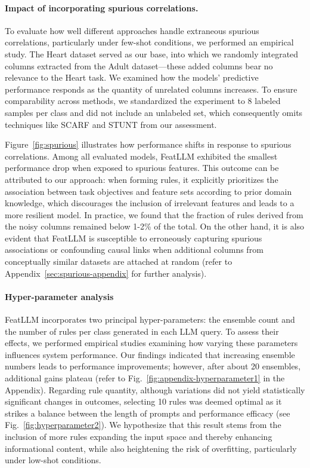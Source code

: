 \vspace*{-0.12in}
\paragraph{Impact of incorporating spurious correlations.} To evaluate how well different approaches handle extraneous spurious correlations, particularly under few-shot conditions, we performed an empirical study. The Heart dataset served as our base, into which we randomly integrated columns extracted from the Adult dataset—these added columns bear no relevance to the Heart task. We examined how the models' predictive performance responds as the quantity of unrelated columns increases. To ensure comparability across methods, we standardized the experiment to 8 labeled samples per class and did not include an unlabeled set, which consequently omits techniques like SCARF and STUNT from our assessment. 

Figure~\ref{fig:spurious} illustrates how performance shifts in response to spurious correlations. Among all evaluated models, \textsf{FeatLLM} exhibited the smallest performance drop when exposed to spurious features. This outcome can be attributed to our approach: when forming rules, it explicitly prioritizes the association between task objectives and feature sets according to prior domain knowledge, which discourages the inclusion of irrelevant features and leads to a more resilient model. In practice, we found that the fraction of rules derived from the noisy columns remained below 1-2\% of the total. On the other hand, it is also evident that \textsf{FeatLLM} is susceptible to erroneously capturing spurious associations or confounding causal links when additional columns from conceptually similar datasets are attached at random (refer to Appendix~\ref{sec:spurious-appendix} for further analysis).

\vspace*{-0.12in}
\paragraph{Hyper-parameter analysis}
\textsf{FeatLLM} incorporates two principal hyper-parameters: the ensemble count and the number of rules per class generated in each LLM query. To assess their effects, we performed empirical studies examining how varying these parameters influences system performance. Our findings indicated that increasing ensemble numbers leads to performance improvements; however, after about 20 ensembles, additional gains plateau (refer to Fig.~\ref{fig:appendix-hyperparameter1} in the Appendix). Regarding rule quantity, although variations did not yield statistically significant changes in outcomes, selecting 10 rules was deemed optimal as it strikes a balance between the length of prompts and performance efficacy (see Fig.~\ref{fig:hyperparameter2}). We hypothesize that this result stems from the inclusion of more rules expanding the input space and thereby enhancing informational content, while also heightening the risk of overfitting, particularly under low-shot conditions.


